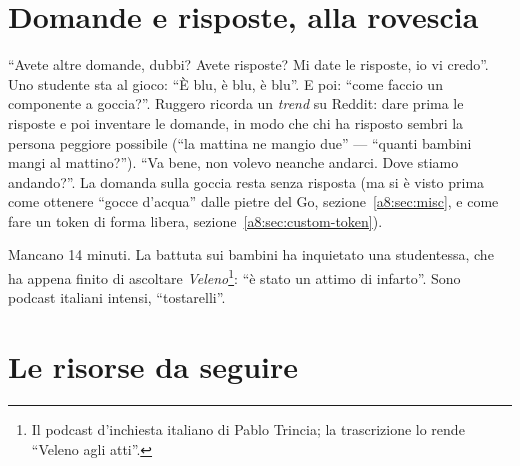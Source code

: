 \section{Domande e risposte, alla rovescia}
\label{a8:sec:rovescia}

``Avete altre domande, dubbi? Avete risposte? Mi date le risposte, io vi credo''. Uno
studente sta al gioco: ``È blu, è blu, è blu''. E poi: ``come faccio un componente a
goccia?''. Ruggero ricorda un \emph{trend} su Reddit: dare prima le risposte e poi
inventare le domande, in modo che chi ha risposto sembri la persona peggiore possibile
(``la mattina ne mangio due'' --- ``quanti bambini mangi al mattino?''). ``Va bene, non
volevo neanche andarci. Dove stiamo andando?''. La domanda sulla goccia resta senza
risposta (ma si è visto prima come ottenere ``gocce d'acqua'' dalle pietre del Go,
sezione~\ref{a8:sec:misc}, e come fare un token di forma libera,
sezione~\ref{a8:sec:custom-token}).

Mancano 14 minuti. La battuta sui bambini ha inquietato una studentessa, che ha appena
finito di ascoltare \emph{Veleno}\footnote{Il podcast d'inchiesta italiano di Pablo
Trincia; la trascrizione lo rende ``Veleno agli atti''.}: ``è stato un attimo di
infarto''. Sono podcast italiani intensi, ``tostarelli''.

\section{Le risorse da seguire}
\label{a8:sec:risorse}

